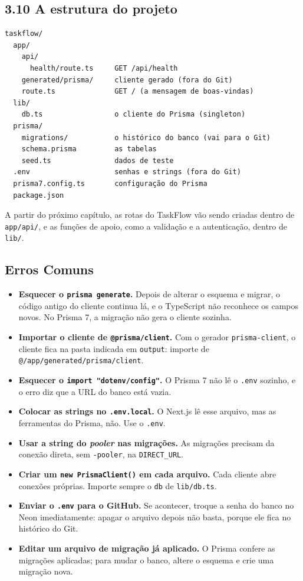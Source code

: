 \subsection{3.10 A estrutura do projeto}

\begin{codigo}
\begin{Verbatim}[breaklines=true, breaksymbolleft={}, fontsize=\footnotesize]
taskflow/
  app/
    api/
      health/route.ts     GET /api/health
    generated/prisma/     cliente gerado (fora do Git)
    route.ts              GET / (a mensagem de boas-vindas)
  lib/
    db.ts                 o cliente do Prisma (singleton)
  prisma/
    migrations/           o histórico do banco (vai para o Git)
    schema.prisma         as tabelas
    seed.ts               dados de teste
  .env                    senhas e strings (fora do Git)
  prisma7.config.ts       configuração do Prisma
  package.json
\end{Verbatim}
\end{codigo}

A partir do próximo capítulo, as rotas do TaskFlow vão sendo criadas dentro de \texttt{app/api/}, e as funções de apoio, como a validação e a autenticação, dentro de \texttt{lib/}.

\subsection{Erros Comuns}

\begin{itemize}
  \item \textbf{Esquecer o \texttt{prisma generate}.} Depois de alterar o esquema e migrar, o código antigo do cliente continua lá, e o TypeScript não reconhece os campos novos. No Prisma 7, a migração não gera o cliente sozinha.
  \item \textbf{Importar o cliente de \texttt{@prisma/client}.} Com o gerador \texttt{prisma-client}, o cliente fica na pasta indicada em \texttt{output}: importe de \texttt{@/app/generated/prisma/client}.
  \item \textbf{Esquecer o \texttt{import "dotenv/config"}.} O Prisma 7 não lê o \texttt{.env} sozinho, e o erro diz que a URL do banco está vazia.
  \item \textbf{Colocar as strings no \texttt{.env.local}.} O Next.js lê esse arquivo, mas as ferramentas do Prisma, não. Use o \texttt{.env}.
  \item \textbf{Usar a string do \textit{pooler} nas migrações.} As migrações precisam da conexão direta, sem \texttt{-pooler}, na \texttt{DIRECT\_URL}.
  \item \textbf{Criar um \texttt{new PrismaClient()} em cada arquivo.} Cada cliente abre conexões próprias. Importe sempre o \texttt{db} de \texttt{lib/db.ts}.
  \item \textbf{Enviar o \texttt{.env} para o GitHub.} Se acontecer, troque a senha do banco no Neon imediatamente: apagar o arquivo depois não basta, porque ele fica no histórico do Git.
  \item \textbf{Editar um arquivo de migração já aplicado.} O Prisma confere as migrações aplicadas; para mudar o banco, altere o esquema e crie uma migração nova.
\end{itemize}
